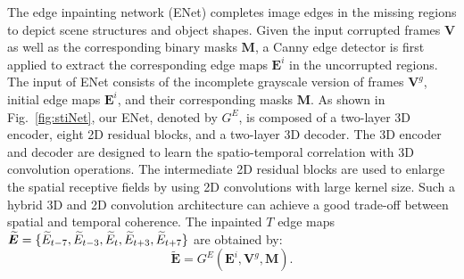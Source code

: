 The edge inpainting network (ENet) completes image edges in the missing regions to depict scene structures and object shapes.
Given the input corrupted frames $\boldsymbol{V}$ as well as the corresponding binary masks $\boldsymbol{M}$, a Canny edge detector is first applied to extract the corresponding edge maps $\boldsymbol{E}^{i}$ in the uncorrupted regions. %
The input of ENet consists of the incomplete grayscale version of frames $\boldsymbol{V}^{g}$, initial edge maps $\boldsymbol{E}^{i}$, and their corresponding masks $\boldsymbol{M}$.
%
As shown in Fig.~\ref{fig:stiNet}, our ENet, denoted by $G^E$, is composed of a two-layer 3D encoder, eight 2D residual blocks, and a two-layer 3D decoder. 
The 3D encoder and decoder are designed to learn the spatio-temporal correlation with 3D convolution operations.
The intermediate 2D residual blocks are used to enlarge the spatial receptive fields by using 2D convolutions with large kernel size.
Such a hybrid 3D and 2D convolution architecture can achieve a good trade-off between spatial and temporal coherence.
The inpainted $T$ edge maps 	$\boldsymbol{\widetilde{E}}=\{\widetilde{E}_{t-7},\widetilde{E}_{t-3},\widetilde{E}_{t},\widetilde{E}_{t+3},\widetilde{E}_{t+7}\}$ are obtained by:
\begin{equation}
	\label{eq:edgenet}
	\boldsymbol{\widetilde{E}}=G^E(\boldsymbol{E}^{i},\boldsymbol{V}^{g},\boldsymbol{M}).
\end{equation}

